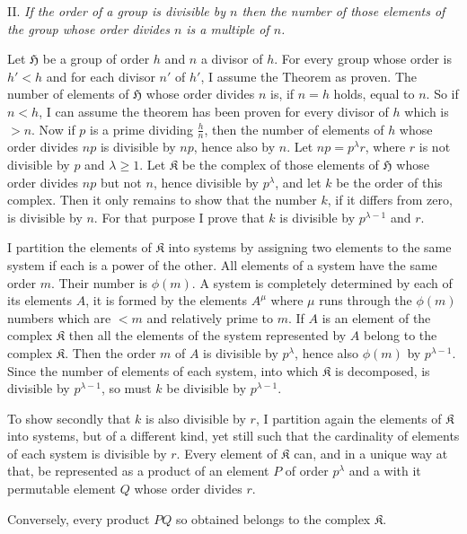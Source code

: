 \documentclass[a5paper,12pt]{article}
\let\fr\mathfrak
\newcommand{\CH}{\fr{H}}
\newcommand{\CK}{\fr{K}}
\newcommand{\?}{{\color{blue}${}^{(?)}$}}
\newcounter{origpagecounter}{}
\newcommand{\origpagebreak}{\mark{\arabic{origpagecounter}}\addtocounter{origpagecounter}{1}\mark{\arabic{origpagecounter}}}
\begin{document}

II.
%
\label{t:2-2}
%
\emph{ %
If the order of a group is divisible by $n$
then the number of those elements of the group
whose order divides $n$
is a multiple of $n$.
}


Let $\CH$ be a group of order $h$
and
$n$ a divisor of $h$.
%
%
For every group whose order is $h' < h$
and
for each divisor $n'$ of $h'$,
I assume the Theorem as proven.
%
%
The number of elements of $\CH$
whose order divides $n$
is,
if $n = h$ holds,
equal to $n$.
%
%
So if $n < h$,
I can assume
the theorem has been proven
for every divisor of $h$
which is $> n$.
%
%
Now if $p$ is a prime
dividing
$\frac{h}{n}$,
then
the number of elements of $h$
whose order divides $n p$
is divisible by $n p$,
hence also by $n$.
%
%
Let $n p = p^\lambda r$,
where $r$ is not divisible by $p$ and $\lambda \geq 1$.
%
%
Let $\CK$
be the complex
of those elements of $\CH$
whose order divides $n p$
but not $n$,
hence divisible by $p^\lambda$,
and let $k$ be the order of this complex.
%
%
Then it only remains to show
that the number $k$,
if it differs from zero,
is divisible by $n$.
%
%
For that purpose I prove
that $k$ is divisible
by $p^{\lambda-1}$ and $r$.


I partition the elements of $\CK$
into systems
by
assigning two elements
to the same system
if each is a power of the other.
%
%
All elements of a system
have the same order $m$.
%
%
Their number is $\phi(m)$.
%
%
A system is completely determined
by each of its elements $A$,
it is formed by the elements $A^\mu$
where $\mu$ runs through the $\phi(m)$ numbers
which are $< m$ and relatively prime to $m$.
%
%
If $A$ is an element of the complex $\CK$
then all the elements
of the system represented by $A$
belong to the complex $\CK$.
%
%
Then the order $m$ of $A$
is divisible by $p^\lambda$,
hence also $\phi(m)$ by $p^{\lambda-1}$.
%
%
Since the number of elements
of each system,
into which $\CK$ is decomposed,
is divisible by $p^{\lambda-1}$,
so
must $k$ be divisible by $p^{\lambda-1}$.


To show secondly
that
$k$ is also divisible by $r$,
I partition again
the elements of $\CK$ into systems,
but of a different kind,
yet still such that
the cardinality of elements
of each system is divisible by $r$.
%
%
Every element of $\CK$ can,
and in a unique way at that,
be represented
as a product
of an element $P$ of order $p^\lambda$
and
a with it permutable element $Q$
whose order divides $r$.
%
%
\origpagebreak
%
%
Conversely,
every product $P Q$
so obtained
belongs
to the complex $\CK$.
\end{document}
